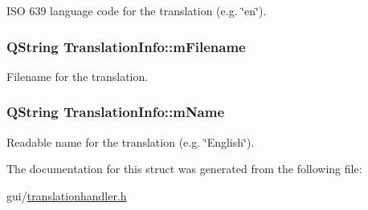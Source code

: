 I\-S\-O 639 language code for the translation (e.\-g. \char`\"{}en\char`\"{}). 

\hypertarget{struct_translation_info_aa5387596bce8820968bde2e257c103c1}{
\subsubsection[{m\-Filename}]{\setlength{\rightskip}{0pt plus 5cm}Q\-String Translation\-Info\-::m\-Filename}}\label{struct_translation_info_aa5387596bce8820968bde2e257c103c1}


Filename for the translation. 

\hypertarget{struct_translation_info_a20c7a02f7bfcdd68a82cf3959cda4435}{
\subsubsection[{m\-Name}]{\setlength{\rightskip}{0pt plus 5cm}Q\-String Translation\-Info\-::m\-Name}}\label{struct_translation_info_a20c7a02f7bfcdd68a82cf3959cda4435}


Readable name for the translation (e.\-g. \char`\"{}\-English\char`\"{}). 



The documentation for this struct was generated from the following file\-:\begin{DoxyCompactItemize}
\item 
gui/\hyperlink{translationhandler_8h}{translationhandler.\-h}\end{DoxyCompactItemize}
